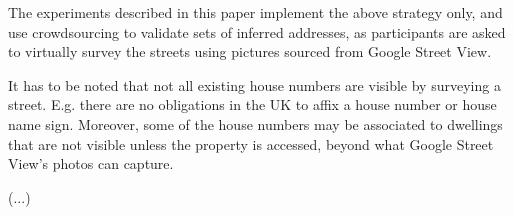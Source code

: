     The experiments described in this paper implement the above strategy only, and  use crowdsourcing to validate sets of inferred addresses, as participants are asked to virtually survey the streets using pictures sourced from Google Street View.
    
    It has to be noted that not all existing house numbers are visible by surveying a street. E.g. there are no obligations in the UK to affix a house number or house name sign. Moreover, some of the house numbers may be associated to dwellings that are not visible unless the property is accessed, beyond what Google Street View's photos can capture.
    
    {(}...{)}